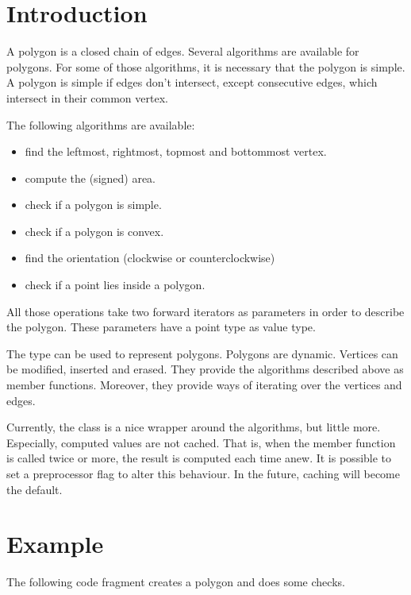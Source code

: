 


\section{Introduction}

A polygon is a closed chain of edges. Several algorithms are available for
polygons. For some of those algorithms, it is necessary that the polygon is
simple. A polygon is simple if edges don't intersect, except consecutive edges,
which intersect in their common vertex.

The following algorithms are available:
\begin{itemize}
\item find the leftmost, rightmost, topmost and bottommost vertex.
\item compute the (signed) area.
\item check if a polygon is simple.
\item check if a polygon is convex.
\item find the orientation (clockwise or counterclockwise)
\item check if a point lies inside a polygon.
\end{itemize}
All those operations take two forward iterators as parameters in order to
describe the polygon. These parameters have a point type as value type.

The type  can be used to represent polygons.
Polygons are dynamic. Vertices can be modified, inserted and erased.
They provide the algorithms described above as member functions.
Moreover, they provide ways of iterating over the vertices and edges.

Currently, the  class is a nice wrapper around the algorithms,
but little more. Especially, computed values are not cached.
That is, when the  member function is called twice or more,
the result is computed each time anew. It is possible to set a preprocessor flag
to alter this behaviour. In the future, caching will become the default.

\section{Example}

The following code fragment creates a polygon and does some checks.




